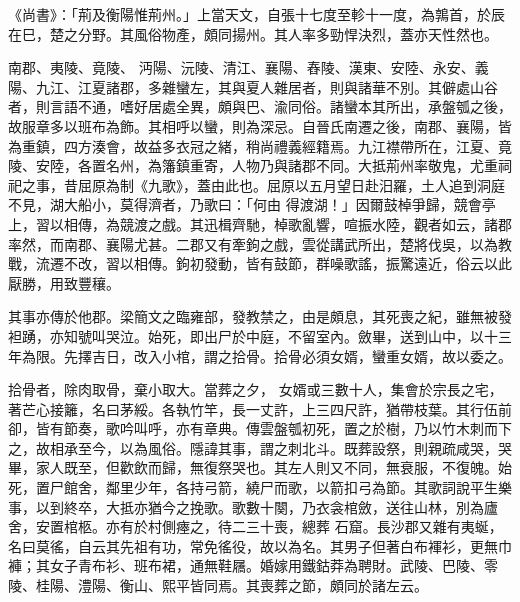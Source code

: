\begin{pinyinscope}
 《尚書》：「荊及衡陽惟荊州。」上當天文，自張十七度至軫十一度，為鶉首，於辰在巳，楚之分野。其風俗物產，頗同揚州。其人率多勁悍決烈，蓋亦天性然也。



 南郡、夷陵、竟陵、
 沔陽、沅陵、清江、襄陽、舂陵、漢東、安陸、永安、義陽、九江、江夏諸郡，多雜蠻左，其與夏人雜居者，則與諸華不別。其僻處山谷者，則言語不通，嗜好居處全異，頗與巴、渝同俗。諸蠻本其所出，承盤瓠之後，故服章多以班布為飾。其相呼以蠻，則為深忌。自晉氏南遷之後，南郡、襄陽，皆為重鎮，四方湊會，故益多衣冠之緒，稍尚禮義經籍焉。九江襟帶所在，江夏、竟陵、安陸，各置名州，為籓鎮重寄，人物乃與諸郡不同。大抵荊州率敬鬼，尤重祠祀之事，昔屈原為制《九歌》，蓋由此也。屈原以五月望日赴汨羅，土人追到洞庭不見，湖大船小，莫得濟者，乃歌曰：「何由
 得渡湖！」因爾鼓棹爭歸，競會亭上，習以相傳，為競渡之戲。其迅楫齊馳，棹歌亂響，喧振水陸，觀者如云，諸郡率然，而南郡、襄陽尤甚。二郡又有牽鉤之戲，雲從講武所出，楚將伐吳，以為教戰，流遷不改，習以相傳。鉤初發動，皆有鼓節，群噪歌謠，振驚遠近，俗云以此厭勝，用致豐穰。



 其事亦傳於他郡。梁簡文之臨雍部，發教禁之，由是頗息，其死喪之紀，雖無被發袒踴，亦知號叫哭泣。始死，即出尸於中庭，不留室內。斂畢，送到山中，以十三年為限。先擇吉日，改入小棺，謂之拾骨。拾骨必須女婿，蠻重女婿，故以委之。



 拾骨者，除肉取骨，棄小取大。當葬之夕，
 女婿或三數十人，集會於宗長之宅，著芒心接籬，名曰茅綏。各執竹竿，長一丈許，上三四尺許，猶帶枝葉。其行伍前卻，皆有節奏，歌吟叫呼，亦有章典。傳雲盤瓠初死，置之於樹，乃以竹木刺而下之，故相承至今，以為風俗。隱諱其事，謂之刺北斗。既葬設祭，則親疏咸哭，哭畢，家人既至，但歡飲而歸，無復祭哭也。其左人則又不同，無衰服，不復魄。始死，置尸館舍，鄰里少年，各持弓箭，繞尸而歌，以箭扣弓為節。其歌詞說平生樂事，以到終卒，大抵亦猶今之挽歌。歌數十闋，乃衣衾棺斂，送往山林，別為廬舍，安置棺柩。亦有於村側瘞之，待二三十喪，總葬
 石窟。長沙郡又雜有夷蜒，名曰莫徭，自云其先祖有功，常免徭役，故以為名。其男子但著白布褌衫，更無巾褲；其女子青布衫、班布裙，通無鞋屩。婚嫁用鐵鈷莽為聘財。武陵、巴陵、零陵、桂陽、澧陽、衡山、熙平皆同焉。其喪葬之節，頗同於諸左云。



\end{pinyinscope}